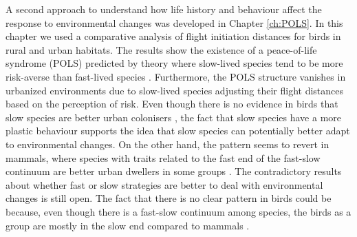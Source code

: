 A second approach to understand how life history and behaviour affect the
response to environmental changes was developed in Chapter \ref{ch:POLS}. In
this chapter we used a comparative analysis of flight initiation distances for
birds in rural and urban habitats. The results show the existence of a
peace-of-life syndrome (POLS) predicted by theory where slow-lived species tend
to be more risk-averse than fast-lived species \citep{Reale2010a}.
Furthermore, the POLS structure vanishes in urbanized environments due to
slow-lived species adjusting their flight distances based on the perception of
risk. Even though there is no evidence in birds that slow species are better
urban colonisers \citep{Sol2014}, the fact that slow species have a more plastic
behaviour supports the idea that slow species can potentially better adapt to
environmental changes.
On the other hand, the pattern seems to revert in mammals, where species with
traits related to the fast end of the fast-slow continuum are better urban
dwellers in some groups \citep{Santini2019}.
The contradictory results about whether fast or slow strategies are better to
deal with environmental changes is still open. The fact that there is no clear
pattern in birds could be because, even though there is a fast-slow continuum
among species, the birds as a group are mostly in the slow end compared to
mammals \citep{Healy2014}.

\bigskip

